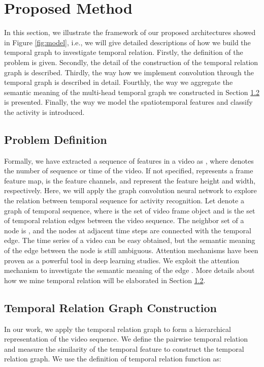 \documentclass[conference,compsoc]{IEEEtran}
\begin{document}
\section{Proposed Method}
\label{sec:method}
    In this section, we illustrate the framework of our proposed architectures showed in Figure \ref{fig:model}, i.e., we will give detailed descriptions of how we build the temporal graph to investigate temporal relation. Firstly, the definition of the problem is given. Secondly, the detail of the construction of the temporal relation graph is described. Thirdly, the way how we implement convolution through the temporal graph is described in detail. Fourthly, the way we aggregate the semantic meaning of the multi-head temporal graph we constructed in Section \ref{subsec:graph} is presented. Finally, the way we model the spatiotemporal features and classify the activity is introduced. 
    
    
\subsection{Problem Definition}
    Formally, we have extracted a sequence of features in a video as , where  denotes the number of sequence or time of the video. If not specified,  represents a frame feature map,  is the feature channels, and  represent the feature height and width, respectively. Here, we will apply the graph convolution neural network to explore the relation between temporal sequence  for activity recognition. Let  denote a graph of temporal sequence, where  is the set of  video frame object and  is the set of temporal relation edges between the video sequence. The neighbor set of a node  is , and the nodes at adjacent time steps are connected with the temporal edge. The time series of a video can be easy obtained, but the semantic meaning of the edge  between the node is still ambiguous. Attention mechanisms have been proven as a powerful tool in deep learning studies. We exploit the attention mechanism to investigate the semantic meaning of the edge . More details about how we mine temporal relation will be elaborated in Section \ref{subsec:graph}.
    
\subsection{Temporal Relation Graph Construction}
\label{subsec:graph}
    In our work, we apply the temporal relation graph to form a hierarchical representation of the video sequence. We define the pairwise temporal relation and measure the similarity of the temporal feature to construct the temporal relation graph. We use the definition of temporal relation function as:
    
\end{document}
